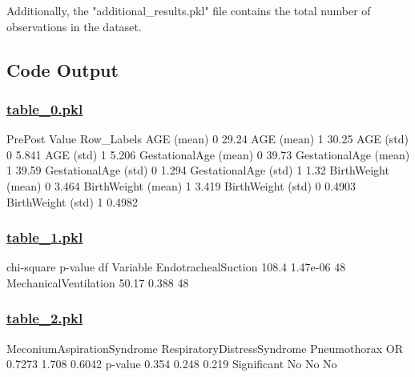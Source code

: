\documentclass[11pt]{article}
\begin{document}
Additionally, the "additional\_results.pkl" file contains the total number of observations in the dataset.

\subsection{Code Output}\hypertarget{file-table-0-pkl}{}

\subsubsection*{\hyperlink{code-Data Analysis-table-0-pkl}{table\_0.pkl}}

\begin{codeoutput}
                       PrePost  Value
Row\_Labels                           
AGE (mean)                   0  29.24
AGE (mean)                   1  30.25
AGE (std)                    0  5.841
AGE (std)                    1  5.206
GestationalAge (mean)        0  39.73
GestationalAge (mean)        1  39.59
GestationalAge (std)         0  1.294
GestationalAge (std)         1   1.32
BirthWeight (mean)           0  3.464
BirthWeight (mean)           1  3.419
BirthWeight (std)            0 0.4903
BirthWeight (std)            1 0.4982
\end{codeoutput}\hypertarget{file-table-1-pkl}{}

\subsubsection*{\hyperlink{code-Data Analysis-table-1-pkl}{table\_1.pkl}}

\begin{codeoutput}
                       chi-square   p-value  df
Variable                                       
EndotrachealSuction         108.4  1.47e-06  48
MechanicalVentilation       50.17     0.388  48
\end{codeoutput}\hypertarget{file-table-2-pkl}{}

\subsubsection*{\hyperlink{code-Data Analysis-table-2-pkl}{table\_2.pkl}}

\begin{codeoutput}
            MeconiumAspirationSyndrome RespiratoryDistressSyndrome Pneumothorax
OR                              0.7273                       1.708       0.6042
p-value                          0.354                       0.248        0.219
Significant                         No                          No           No
\end{codeoutput}\hypertarget{file-additional-results-pkl}{}
\end{document}
